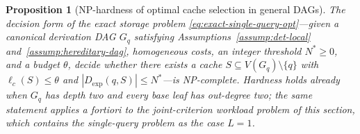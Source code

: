 \documentclass[journal]{IEEEtran}
\newtheorem{proposition}{Proposition}[section]
\numberwithin{equation}{section}
\begin{document}
\begin{proposition}[NP-hardness of optimal cache selection in general DAGs]
\label{prop:module-selection-np-hard}
The decision form of the exact storage problem
\eqref{eq:exact-single-query-opt}---given a canonical derivation DAG \(G_q\)
satisfying Assumptions~\ref{assump:det-local}
and~\ref{assump:hereditary-dag}, homogeneous costs, an integer threshold
\(N^{*}\ge 0\), and a budget \(\theta\), decide whether there exists a cache
\(S\subseteq V(G_q)\setminus\{q\}\) with \(\ell_c(S)\le\theta\) and
\(|D_{\mathrm{exp}}(q,S)|\le N^{*}\)---is \emph{NP-complete}.  Hardness holds
already when \(G_q\) has depth two and every base leaf has out-degree two;
the same statement applies \emph{a fortiori} to the joint-criterion workload
problem of this section, which contains the single-query problem as the case
\(L=1\).
\end{proposition}
\end{document}
